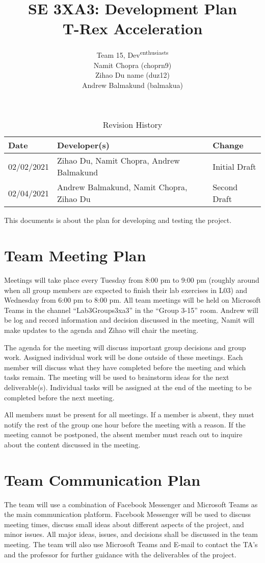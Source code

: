\documentclass{article}
\title{SE 3XA3: Development Plan\\T-Rex Acceleration}
\author{Team 15, Dev\textsuperscript{enthusiasts}
		\\ Namit Chopra (choprn9)
		\\ Zihao Du name (duz12)
		\\ Andrew Balmakund (balmakua)
}
\date{}
\begin{document}
\begin{table}[hp]
\caption{Revision History} \label{TblRevisionHistory}
\begin{tabularx}{\textwidth}{llX}
\toprule
\textbf{Date} & \textbf{Developer(s)} & \textbf{Change}\\
\midrule
02/02/2021 & Zihao Du, Namit Chopra, Andrew Balmakund & Initial Draft\\
02/04/2021 & Andrew Balmakund, Namit Chopra, Zihao Du & Second Draft\\
\bottomrule
\end{tabularx}
\end{table}

\newpage

\maketitle

This documents is about the plan for developing and testing the project.

\section{Team Meeting Plan}
Meetings will take place every Tuesday from 8:00 pm to 9:00 pm (roughly around when all group members are expected to finish their lab exercises in L03) and Wednesday from 6:00 pm to 8:00 pm. All team meetings will be held on Microsoft Teams in the channel ``Lab3Groups3xa3'' in the ``Group 3-15'' room. Andrew will be log and record information and decision discussed in the meeting, Namit will make updates to the agenda and Zihao will chair the meeting.

The agenda for the meeting will discuss important group decisions and group work. Assigned individual work will be done outside of these meetings. Each member will discuss what they have completed before the meeting and which tasks remain. The meeting will be used to brainstorm ideas for the next deliverable(s). Individual tasks will be assigned at the end of the meeting to be completed before the next meeting.

All members must be present for all meetings. If a member is absent, they must notify the rest of the group one hour before the meeting with a reason. If the meeting cannot be postponed, the absent member must reach out to inquire about the content discussed in the meeting.

\section{Team Communication Plan}
The team will use a combination of Facebook Messenger and Microsoft Teams as the main communication platform. Facebook Messenger will be used to discuss meeting times, discuss small ideas about different aspects of the project, and minor issues. All major ideas, issues, and decisions shall be discussed in the team meeting. The team will also use Microsoft Teams and E-mail to contact the TA's and the professor for further guidance with the deliverables of the project.  
\end{document}
